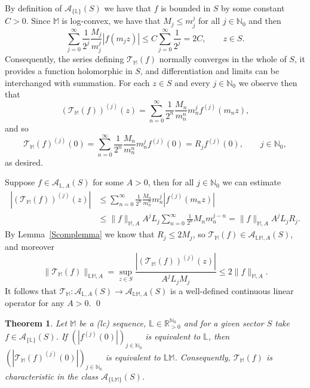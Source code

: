 \documentclass[11pt,a4paper]{article}
\theoremstyle{plain}
\newtheorem{theorem}[proposition]{Theorem}
\theoremstyle{definition}
\newcommand{\RR}{\mathbb{R}}
\newcommand{\NN}{\mathbb{N}}
\newcommand{\M}{\mathbb{M}}
\newcommand{\LL}{\mathbb{L}}
\begin{document}
By definition of $\mathcal{A}_{\{\LL\}} (S)$ we have that $f$ is bounded in $S$ by some constant $C>0$. Since $\M$ is log-convex, we have that $M_j\le m_j^j$ for all $j\in\NN_0$ and then
	$$\sum_{j=0}^{\infty}\frac{1}{2^j} \frac{M_j}{m_j^j} \left|f(m_j z) \right| \leq  C  \sum_{j=0}^{\infty}\frac{1}{2^j}=2C, \qquad z\in S.$$
Consequently, the series defining $\mathcal{T}_{\M} (f)$ normally converges in the whole of $S$, it provides a function holomorphic in $S$, and differentiation and limits can be interchanged with summation.
For each $z\in S$ and every $j\in\NN_0$ we observe then that
	$$(\mathcal{T}_{\M} (f))^{(j)} (z)= \sum_{n=0}^{\infty}\frac{1}{2^n} \frac{M_n}{m_n^n} m_n^jf^{(j)}(m_n z),$$
and so
$$
\mathcal{T}_{\M} (f)^{(j)}(0)=\sum_{n=0}^{\infty}\frac{1}{2^n} \frac{M_n}{m_n^n} m_n^jf^{(j)}(0)=R_jf^{(j)}(0),\qquad j\in\NN_0,$$
as desired.

Suppose $f\in \mathcal{A}_{\LL,A} (S)$ for some $A>0$, then for all $j\in\NN_0$ we can estimate
\begin{align*}
|(\mathcal{T}_{\M} (f))^{(j)} (z)|&\le \sum_{n=0}^{\infty}\frac{1}{2^n} \frac{M_n}{m_n^n}m_n^j |f^{(j)}(m_nz)|
 \\&
 \le \|f\|_{\M,A} A^j L_j \sum_{n=0}^{\infty}\frac{1}{2^n}M_nm_n^{j-n}=\|f\|_{\M,A} A^j L_j R_j.
\end{align*}
By Lemma~\ref{Scomplemma} we know that $R_j\le 2M_j$, so $\mathcal{T}_{\M} (f)\in \mathcal{A}_{\LL\M, A } (S)$, and moreover
$$\|\mathcal{T}_{\M} (f)\|_{\LL\M, A}=\sup_{z\in S}\frac{|(\mathcal{T}_{\M} (f))^{(j)} (z)|}{A^j L_j M_j}\le 2\|f\|_{\M,A}.$$
It follows that $\mathcal{T}_{\M} : \mathcal{A} _{\LL, A} (S)\rightarrow\mathcal{A}_{\LL\M, A } (S)$ is a well-defined continuous linear operator for any $A>0$.
\qed\enddemo

\begin{theorem}\label{CharacteristicTransform1}
 Let $\M$ be a (lc) sequence, $\LL\in\RR_{>0}^{\NN_0}$ and for a given sector $S$ take $f\in \mathcal{A}_{\{\LL\}} (S)$. %
	If $(|f^{(j)}(0)|)_{j\in\NN_0}$ is equivalent to $\LL$, then
$(|\mathcal{T}_{\M} (f)^{(j)}(0)|)_{j\in\NN_0}$
	is equivalent to $\LL\M$.
	Consequently, $\mathcal{T}_{\M} (f)$ is characteristic in the class $\mathcal{A}_{\{\LL\M\}} (S)$.
\end{theorem}
\end{document}
